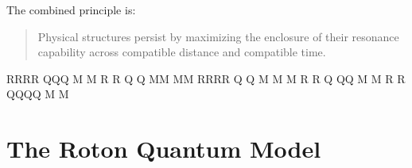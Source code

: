 \documentclass[11pt,a4paper]{article}
\begin{document}
The combined principle is:

\begin{quote}
Physical structures persist by maximizing the enclosure of their resonance capability across compatible distance and compatible time.
\end{quote}





RRRR     QQQ    M   M
R   R   Q   Q   MM MM
RRRR    Q   Q   M M M
R  R    Q  QQ   M   M
R   R    QQQQ   M   M












\section{The Roton Quantum Model}


\end{document}
